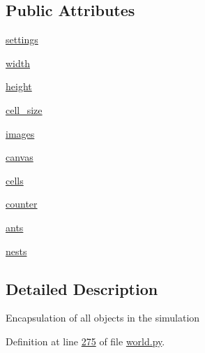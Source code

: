 \subsection*{Public Attributes}
\begin{DoxyCompactItemize}
\item 
\hyperlink{classworld_1_1World_a41e0f9d00bb365408abee5a084bdce24}{settings}
\item 
\hyperlink{classworld_1_1World_a5ace9de2d4cd40bbb013db9712f4ef34}{width}
\item 
\hyperlink{classworld_1_1World_acfdba03fac144372fcc56922a1a339a2}{height}
\item 
\hyperlink{classworld_1_1World_ae1d7a76e88da46ba689ac807d6a9a961}{cell\+\_\+size}
\item 
\hyperlink{classworld_1_1World_a9388f4c8146cbf9983f4a42c3015b61a}{images}
\item 
\hyperlink{classworld_1_1World_a6b3bb67973002c5018e11031462c31eb}{canvas}
\item 
\hyperlink{classworld_1_1World_a2314ff704272429f24c5d1f731ce7e8d}{cells}
\item 
\hyperlink{classworld_1_1World_a93d8708ed00be71dfd78cb42767529ce}{counter}
\item 
\hyperlink{classworld_1_1World_aff3d808329d4220a8bd5e917c151c14a}{ants}
\item 
\hyperlink{classworld_1_1World_af8524470ea81aa32b4c4045f4d5768e7}{nests}
\end{DoxyCompactItemize}


\subsection{Detailed Description}
\begin{DoxyVerb}Encapsulation of all objects in the simulation
\end{DoxyVerb}
 

Definition at line \hyperlink{world_8py_source_l00275}{275} of file \hyperlink{world_8py_source}{world.\+py}.



